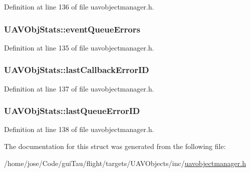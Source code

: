 Definition at line 136 of file uavobjectmanager.\-h.

\hypertarget{struct_u_a_v_obj_stats_a0dc695f48120e441e86ad99fe656627a}{
\subsubsection[{event\-Queue\-Errors}]{ U\-A\-V\-Obj\-Stats\-::event\-Queue\-Errors}}\label{struct_u_a_v_obj_stats_a0dc695f48120e441e86ad99fe656627a}


Definition at line 135 of file uavobjectmanager.\-h.

\hypertarget{struct_u_a_v_obj_stats_ac3961ffa474982b4c8678fcfd240476f}{
\subsubsection[{last\-Callback\-Error\-I\-D}]{ U\-A\-V\-Obj\-Stats\-::last\-Callback\-Error\-I\-D}}\label{struct_u_a_v_obj_stats_ac3961ffa474982b4c8678fcfd240476f}


Definition at line 137 of file uavobjectmanager.\-h.

\hypertarget{struct_u_a_v_obj_stats_a7ad7134bdc6a7f7807b8387a71f507a0}{
\subsubsection[{last\-Queue\-Error\-I\-D}]{ U\-A\-V\-Obj\-Stats\-::last\-Queue\-Error\-I\-D}}\label{struct_u_a_v_obj_stats_a7ad7134bdc6a7f7807b8387a71f507a0}


Definition at line 138 of file uavobjectmanager.\-h.



The documentation for this struct was generated from the following file\-:\begin{DoxyCompactItemize}
\item 
/home/jose/\-Code/gui\-Tau/flight/targets/\-U\-A\-V\-Objects/inc/\hyperlink{targets_2_u_a_v_objects_2inc_2uavobjectmanager_8h}{uavobjectmanager.\-h}\end{DoxyCompactItemize}
